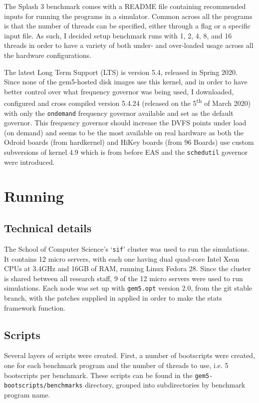 The Splash 3 benchmark comes with a README file containing recommended inputs 
for running the programs in a simulator. Common across all the programs is that 
the number of threads can be specified, either through a flag or a specific 
input file. As such, I decided setup benchmark runs with 1, 2, 4, 8, and 16 
threads in order to have a variety of both under- and over-loaded usage across 
all the hardware configurations.

The latest Long Term Support (LTS) is version 5.4, released in Spring 2020. 
Since none of the gem5-hosted disk images use this kernel, and in order to have 
better control over what frequency governor was being used, I downloaded, 
configured and cross compiled version 5.4.24 (released on the 
5\textsuperscript{th} of March 2020) with only the \texttt{ondemand} frequency 
governor available and set as the default governor. This frequency governor 
should increase the DVFS points under load (on demand) and seems to be the most 
available on real hardware as both the Odroid boards (from hardkernel) and 
HiKey boards (from 96 Boards) use custom subversions of kernel 4.9 which is 
from before EAS and the \texttt{schedutil} governor were introduced.

\section{Running}
    \subsection{Technical details}
    The School of Computer Science's `\texttt{sif}' cluster was used to run the 
    simulations. It contains 12 micro servers, with each one having dual 
    quad-core Intel Xeon CPUs at 3.4GHz and 16GB of RAM, running Linux Fedora 
    28. Since the cluster is shared between all research staff, 9 of the 12 
    micro servers were used to run simulations. Each node was set up with 
    \texttt{gem5.opt} version 2.0, from the git stable branch, with the patches
    supplied in \cite{hansen_gem5-319_2020} applied in order to make the stats 
    framework function.
    
    \subsection{Scripts}
    Several layers of scripts were created. First, a number of bootscripts were 
    created, one for each benchmark program and the number of threads to use, 
    i.e. 5 bootscripts per benchmark. These scripts can be found in the 
    \texttt{gem5-bootscripts/benchmarks} directory, grouped into subdirectories 
    by benchmark program name.
    

